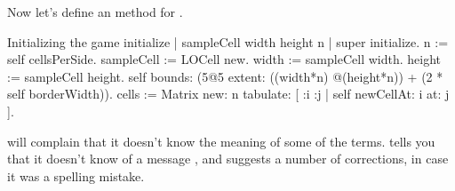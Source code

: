 \documentclass[a4paper,10pt,twoside]{book}
\begin{document}
Now let's define an  method for .


\begin{numMethod}[sbegameinitialize]{Initializing the game}
initialize
   | sampleCell width height n |
   super initialize.
   n := self cellsPerSide.
   sampleCell := LOCell new.
   width := sampleCell width.
   height := sampleCell height.
   self bounds: (5@5 extent: ((width*n) @(height*n)) + (2 * self borderWidth)).
   cells := Matrix new: n tabulate: [ :i :j | self newCellAt: i at: j ].
\end{numMethod}


\pharo will complain that it doesn't know the meaning of some of the terms.
\pharo tells you that it doesn't know of a message , and suggests a number of corrections, in case it was a spelling mistake.
\end{document}
